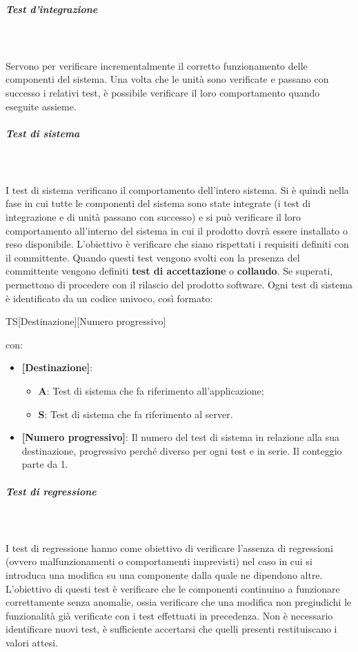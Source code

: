 \subparagraph{Test d’integrazione} \mbox{}\\ \\
Servono per verificare incrementalmente il corretto funzionamento delle componenti del sistema.
Una volta che le unità sono verificate e passano con successo i relativi test, è possibile verificare il loro comportamento quando eseguite assieme.

\subparagraph{Test di sistema} \mbox{}\\ \\
I test di sistema verificano il comportamento dell’intero sistema.
Si è quindi nella fase in cui tutte le componenti del sistema sono state integrate (i test di integrazione e di unità passano con successo) e si può verificare il loro comportamento all’interno del sistema in cui il prodotto dovrà essere installato o reso disponibile.
L'obiettivo è verificare che siano rispettati i requisiti definiti con il committente.
Quando questi test vengono svolti con la presenza del committente vengono definiti \textbf{test di accettazione} o \textbf{collaudo}. Se superati, permettono di procedere con il rilascio del prodotto software.
Ogni test di sistema è identificato da un codice univoco, così formato:
\begin{center}
    TS[Destinazione][Numero progressivo]
\end{center}
con:
\begin{itemize}
    \item \textbf{[Destinazione]}:
    \begin{itemize}
        \item \textbf{A}: Test di sistema che fa riferimento all'applicazione;
        \item \textbf{S}: Test di sistema che fa riferimento al server.
    \end{itemize}
    \item \textbf{[Numero progressivo]}: Il numero del test di sistema in relazione alla sua destinazione, progressivo perché diverso per ogni test e in serie. Il conteggio parte da 1.
\end{itemize}

\subparagraph{Test di regressione} \mbox{}\\ \\
I test di regressione hanno come obiettivo di verificare l'assenza di regressioni (ovvero malfunzionamenti o comportamenti imprevisti) nel caso in cui si introduca una modifica su una componente dalla quale ne dipendono altre.
L'obiettivo di questi test è verificare che le componenti continuino a funzionare correttamente senza anomalie, ossia verificare che una modifica non pregiudichi le funzionalità già verificate con i test effettuati in precedenza.
Non è necessario identificare nuovi test, è sufficiente accertarsi che quelli presenti restituiscano i valori attesi.